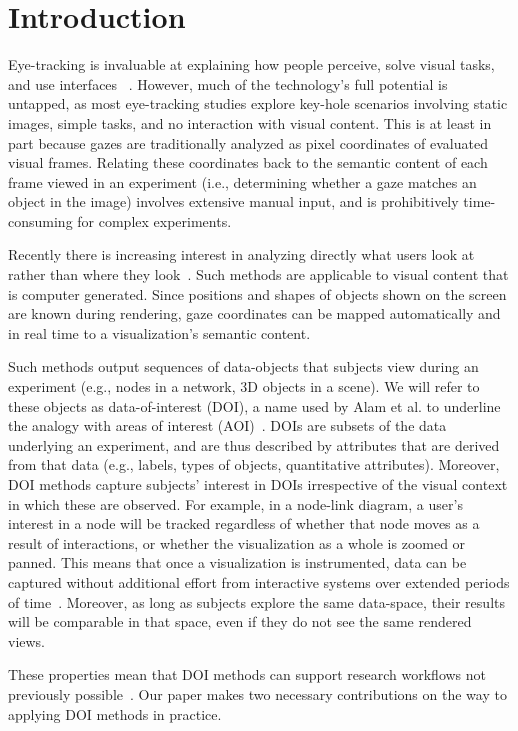 \section{Introduction}
Eye-tracking is invaluable at explaining how people perceive, solve visual tasks, and use interfaces ~\cite{duchowski2002breadth}. However, much of the technology's full potential is untapped, as most eye-tracking studies explore key-hole scenarios involving static images, simple tasks, and no interaction with visual content. This is at least in part because gazes are traditionally analyzed as pixel coordinates of evaluated visual frames. Relating these coordinates back to the semantic content of each frame viewed in an experiment (i.e., determining whether a gaze matches an object in the image) involves extensive manual input, and is prohibitively time-consuming for complex experiments.
 
Recently there is increasing interest in analyzing directly what users look at rather than where they look~\cite{alam15analyzing, sundstedt2013visual, bernhard2014gaze}. Such methods are applicable to visual content that is computer generated. Since positions and shapes of objects shown on the screen are known during rendering, gaze coordinates can be mapped automatically and in real time to a visualization's semantic content.  

Such methods output sequences of data-objects that subjects view during an experiment (e.g., nodes in a network, 3D objects in a scene). We will refer to these objects as data-of-interest (DOI), a name used by Alam et al. to underline the analogy with areas of interest (AOI)~\cite{alam15analyzing}. DOIs are subsets of the data underlying an experiment, and are thus described by attributes that are derived from that data (e.g., labels, types of objects, quantitative attributes). Moreover, DOI methods capture subjects' interest in DOIs irrespective of the visual context in which these are observed. For example, in a node-link diagram, a user's interest in a node will be tracked regardless of whether that node moves as a result of interactions, or whether the visualization as a whole is zoomed or panned. This means that once a visualization is instrumented, data can be captured without additional effort from interactive systems over extended periods of time~\cite{alam15analyzing}. Moreover, as long as subjects explore the same data-space, their results will be comparable in that space, even if they do not see the same rendered views. 

These properties mean that DOI methods can support research workflows not previously possible~\cite{alam15analyzing, sundstedt2013visual, bernhard2014gaze}. Our paper makes two necessary contributions on the way to applying DOI methods in practice.
 
